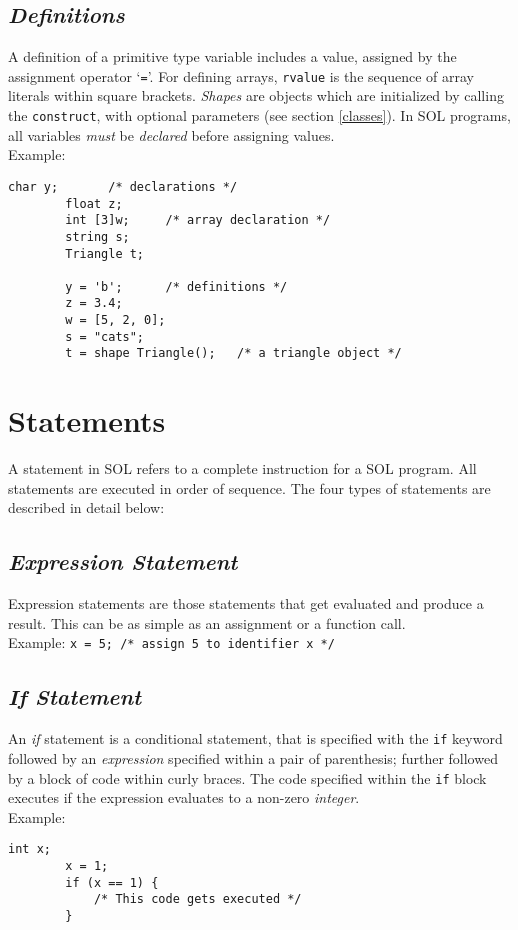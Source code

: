     \subsection{\textit{Definitions}}
    A definition of a primitive type variable includes a value, assigned by the assignment operator `\texttt{=}'. For defining arrays, \texttt{rvalue} is the sequence of array literals within square brackets. \textit{Shapes} are objects which are initialized by calling the \texttt{construct}, with optional parameters (see section \ref{classes}). In SOL programs, all variables \textit{must} be \textit{declared} before assigning values.\\
    Example:\\
    \begin{lstlisting}[style=sol]
        char y;       /* declarations */
        float z;
        int [3]w;     /* array declaration */
        string s;
        Triangle t;

        y = 'b';      /* definitions */
        z = 3.4;
        w = [5, 2, 0];
        s = "cats";
        t = shape Triangle();   /* a triangle object */
    \end{lstlisting}

\section{Statements}
A statement in SOL refers to a complete instruction for a SOL program. All statements are executed in order of sequence. The four types of statements are described in detail below:\\

    \subsection{\textit{Expression Statement}}
    Expression statements are those statements that get evaluated and produce a result. This can be as simple as an assignment or a function call.\\
    Example: \texttt{x = 5; /* assign 5 to identifier x */}

    \subsection{\textit{If Statement}}
    An \textit{if} statement is a conditional statement, that is specified with the \texttt{if} keyword followed by an \textit{expression} specified within a pair of parenthesis; further followed by a block of code within curly braces. The code specified within the \texttt{if} block executes if the expression evaluates to a non-zero \textit{integer}.\\
    Example:\\
    \begin{lstlisting}[style=sol]
        int x;
        x = 1;
        if (x == 1) {
            /* This code gets executed */
        }
    \end{lstlisting}

